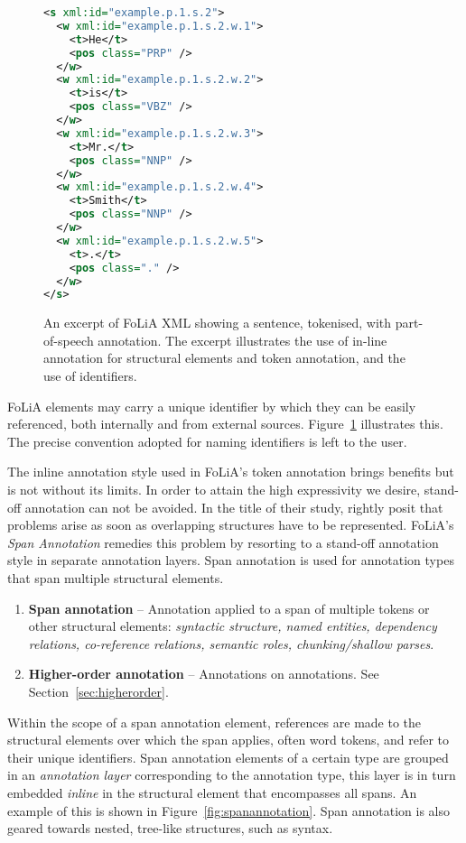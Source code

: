 \documentclass[a4paper,10pt,twoside]{article}
\begin{document}
\begin{figure}[tbh]
\begin{lstlisting}[language=xml]
<s xml:id="example.p.1.s.2">
  <w xml:id="example.p.1.s.2.w.1">
    <t>He</t>
    <pos class="PRP" />
  </w>
  <w xml:id="example.p.1.s.2.w.2">
    <t>is</t>
    <pos class="VBZ" />
  </w>
  <w xml:id="example.p.1.s.2.w.3">
    <t>Mr.</t>
    <pos class="NNP" />
  </w>
  <w xml:id="example.p.1.s.2.w.4">
    <t>Smith</t>
    <pos class="NNP" />
  </w>
  <w xml:id="example.p.1.s.2.w.5">
    <t>.</t>
    <pos class="." />
  </w>
</s>
\end{lstlisting}
\caption{An excerpt of FoLiA XML showing a sentence, tokenised, with
part-of-speech annotation. The excerpt illustrates the use of in-line annotation for
structural elements and token annotation, and the use of identifiers.\label{fig:tokenannotation}}
\end{figure}

FoLiA elements may carry a unique identifier by which they can be easily
referenced, both internally and from external sources.
Figure~\ref{fig:tokenannotation} illustrates this. The precise convention
adopted for naming identifiers is left to the user.

The inline annotation style used in FoLiA's token annotation brings benefits
but is not without its limits. In order to attain the high expressivity we
desire, stand-off annotation can not be avoided. In the title of their study,
\cite{OHCO2} rightly posit that problems arise as soon as overlapping
structures have to be represented. FoLiA's \emph{Span Annotation} remedies
this problem by resorting to a stand-off annotation style in separate
annotation layers. Span annotation is used for annotation types that span
multiple structural elements.

\begin{enumerate}
\setcounter{enumi}{\theenumTemptwo}
\item \textbf{Span annotation} -- 
Annotation applied to a span of multiple tokens or other structural elements:
\emph{syntactic structure, named entities, dependency relations, co-reference
relations, semantic roles, chunking/shallow parses}.
\item \textbf{Higher-order annotation} -- Annotations on annotations. See Section~\ref{sec:higherorder}.
\end{enumerate}


Within the scope of a span annotation element, references are made to the
structural elements over which the span applies, often word tokens,
and refer to their unique identifiers. Span annotation elements of a certain
type are grouped in an \emph{annotation layer} corresponding to the annotation
type, this layer is in turn embedded \emph{inline} in the structural element
that encompasses all spans. An example of this is shown in
Figure~\ref{fig:spanannotation}. Span annotation is also geared towards nested,
tree-like structures, such as syntax.
\end{document}

